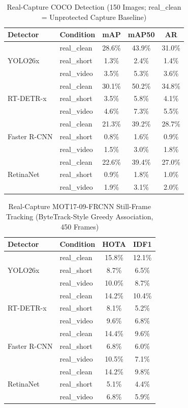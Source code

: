 \documentclass{ieeeaccess}
\begin{document}
\begin{table}[!t]
\caption{Real-Capture COCO Detection (150 Images; real\_clean = Unprotected Capture Baseline)}
\label{tab:real_coco}
\centering
\small
\begin{tabular}{llccc}
\toprule
Detector & Condition & mAP & mAP50 & AR \\
\midrule
\multirow{3}{*}{YOLO26x}
 & real\_clean & 28.6\% & 43.9\% & 31.0\% \\
 & real\_short & 1.3\% & 2.4\% & 1.4\% \\
 & real\_video & 3.5\% & 5.3\% & 3.6\% \\
\midrule
\multirow{3}{*}{RT-DETR-x}
 & real\_clean & 30.1\% & 50.2\% & 34.8\% \\
 & real\_short & 3.5\% & 5.8\% & 4.1\% \\
 & real\_video & 4.6\% & 7.3\% & 5.5\% \\
\midrule
\multirow{3}{*}{Faster R-CNN}
 & real\_clean & 21.3\% & 39.2\% & 28.7\% \\
 & real\_short & 0.8\% & 1.6\% & 0.9\% \\
 & real\_video & 1.5\% & 3.0\% & 1.8\% \\
\midrule
\multirow{3}{*}{RetinaNet}
 & real\_clean & 22.6\% & 39.4\% & 27.0\% \\
 & real\_short & 0.9\% & 1.8\% & 1.0\% \\
 & real\_video & 1.9\% & 3.1\% & 2.0\% \\
\bottomrule
\end{tabular}
\end{table}

\begin{table}[!t]
\caption{Real-Capture MOT17-09-FRCNN Still-Frame Tracking (ByteTrack-Style Greedy Association, 450 Frames)}
\label{tab:real_mot}
\centering
\begin{tabular}{llcc}
\toprule
Detector & Condition & HOTA & IDF1 \\
\midrule
\multirow{3}{*}{YOLO26x}
 & real\_clean & 15.8\% & 12.1\% \\
 & real\_short & 8.7\% & 6.5\% \\
 & real\_video & 10.0\% & 8.7\% \\
\midrule
\multirow{3}{*}{RT-DETR-x}
 & real\_clean & 14.2\% & 10.4\% \\
 & real\_short & 8.1\% & 5.2\% \\
 & real\_video & 9.6\% & 6.8\% \\
\midrule
\multirow{3}{*}{Faster R-CNN}
 & real\_clean & 14.4\% & 9.6\% \\
 & real\_short & 6.8\% & 6.0\% \\
 & real\_video & 10.5\% & 7.1\% \\
\midrule
\multirow{3}{*}{RetinaNet}
 & real\_clean & 14.2\% & 9.8\% \\
 & real\_short & 5.1\% & 4.4\% \\
 & real\_video & 6.8\% & 5.9\% \\
\bottomrule
\end{tabular}
\end{table}
\end{document}
